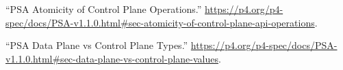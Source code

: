\documentclass[11pt]{article}
\begin{document}
{{\begin{thebibliography}{45}
\mdbibitemlabel{{}[28]}\textquotedblleft{}PSA Atomicity of Control Plane Operations.\textquotedblright{} \href{https://p4.org/p4-spec/docs/PSA-v1.1.0.html\%23sec-atomicity-of-control-plane-api-operations}{{\ttfamily https://\hspace{0pt}p4.\hspace{0pt}org/\hspace{0pt}p4-\hspace{0pt}spec/\hspace{0pt}docs/\hspace{0pt}PSA-\hspace{0pt}v1.\hspace{0pt}1.\hspace{0pt}0.\hspace{0pt}html\#\hspace{0pt}sec-\hspace{0pt}atomicity-\hspace{0pt}of-\hspace{0pt}control-\hspace{0pt}plane-\hspace{0pt}api-\hspace{0pt}operations}}.\label{psaatomicityofcontrolplaneops}%

\mdbibitemlabel{{}[29]}\textquotedblleft{}PSA Data Plane vs Control Plane Types.\textquotedblright{} \href{https://p4.org/p4-spec/docs/PSA-v1.1.0.html\%23sec-data-plane-vs-control-plane-values}{{\ttfamily https://\hspace{0pt}p4.\hspace{0pt}org/\hspace{0pt}p4-\hspace{0pt}spec/\hspace{0pt}docs/\hspace{0pt}PSA-\hspace{0pt}v1.\hspace{0pt}1.\hspace{0pt}0.\hspace{0pt}html\#\hspace{0pt}sec-\hspace{0pt}data-\hspace{0pt}plane-\hspace{0pt}vs-\hspace{0pt}control-\hspace{0pt}plane-\hspace{0pt}values}}.\label{psatranslation}%


\end{thebibliography}}}
\end{document}
